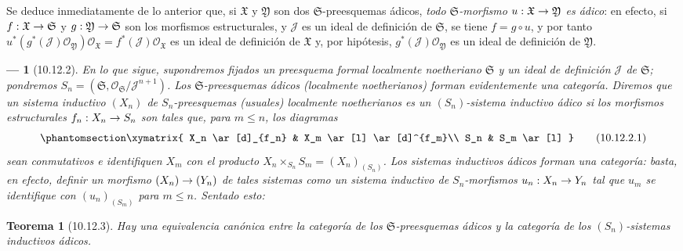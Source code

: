 \documentclass[oneside]{amsart}
\theoremstyle{ega-env-style}
\newtheorem*{env}{---}
\theoremstyle{ega-thm-env-style}
\newtheorem*{theorem}{Teorema}
\theoremstyle{ega-defn-env-style}
\def\leq{\leqslant}                 %
\renewcommand{\to}{\mathchoice{\longrightarrow}{\rightarrow}{\rightarrow}{\rightarrow}}
\let\EGAOriginalLabel\label
\renewcommand{\label}[1]{\phantomsection\EGAOriginalLabel{#1}}
\begin{document}
Se deduce inmediatamente de lo anterior que, si $\mathfrak{X}$ y $\mathfrak{Y}$ son dos $\mathfrak{S}$-preesquemas ádicos, \emph{todo $\mathfrak{S}$-morfismo $u:\mathfrak{X}\to\mathfrak{Y}$ es ádico}:
en efecto, si $f:\mathfrak{X}\to\mathfrak{S}$ y $g:\mathfrak{Y}\to\mathfrak{S}$ son los morfismos estructurales, y $\mathscr{J}$ es un ideal de definición de $\mathfrak{S}$, se tiene $f=g\circ u$, y por tanto $u^*(g^*(\mathscr{J})\mathscr{O}_{\mathfrak{Y}})
\mathscr{O}_{\mathfrak{X}}=f^*(\mathscr{J})
\mathscr{O}_{\mathfrak{X}}$ es un ideal de definición de $\mathfrak{X}$ y, por hipótesis, $g^*(\mathscr{J})\mathscr{O}_{\mathfrak{Y}}$ es un ideal de definición de $\mathfrak{Y}$.

\begin{env}[10.12.2]
\label{I.10.12.2}
En lo que sigue, supondremos fijados un preesquema formal localmente noetheriano $\mathfrak{S}$ y un ideal de definición $\mathscr{J}$ de $\mathfrak{S}$;
pondremos $S_n=(\mathfrak{S},\mathscr{O}_{\mathfrak{S}}/\mathscr{J}^{n+1})$.
Los $\mathfrak{S}$-preesquemas ádicos (localmente noetherianos) forman evidentemente una \emph{categoría}.
Diremos que un sistema inductivo $(X_n)$ de $S_n$-preesquemas (usuales) localmente noetherianos es un \emph{$(S_n)$-sistema inductivo ádico} si los morfismos estructurales $f_n:X_n\to S_n$ son tales que, para $m\leq n$, los diagramas
\[
  \label{I.10.12.2.1-fr}
  \xymatrix{
    X_n \ar[d]_{f_n}
    & X_m \ar[l] \ar[d]^{f_m}\\
    S_n
    & S_m \ar[l]
  }
  \tag{10.12.2.1}
\]
sean conmutativos e \emph{identifiquen $X_m$ con el producto $X_n\times_{S_n}S_m=(X_n)_{(S_n)}$}.
Los sistemas inductivos ádicos forman una \emph{categoría}:
basta, en efecto, definir un morfismo $(X_n)\to(Y_n)$ de tales sistemas como un \emph{sistema inductivo de $S_n$-morfismos $u_n:X_n\to Y_n$} tal que $u_m$ se identifique con $(u_n)_{(S_m)}$ para $m\leq n$.
Sentado esto:
\end{env}

\begin{theorem}[10.12.3]
\label{I.10.12.3}
Hay una equivalencia canónica entre la categoría de los $\mathfrak{S}$-preesquemas ádicos y la categoría de los $(S_n)$-sistemas inductivos ádicos.
\end{theorem}
\end{document}
